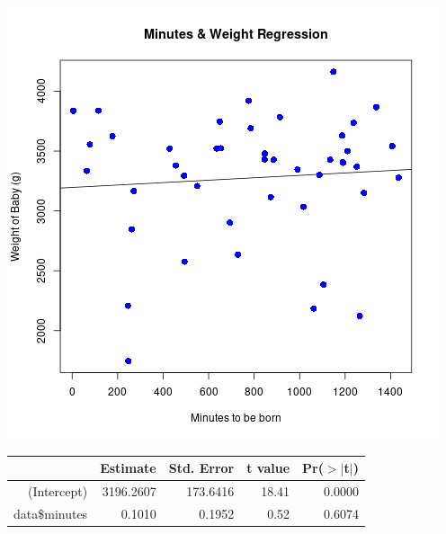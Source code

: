 \documentclass[11pt]{article}
\begin{document}
\begin{center}
\includegraphics[width=.9\linewidth]{bb_minutes_weight.png}
\end{center}

\begin{table}[ht]
\centering
\begin{tabular}{rrrrr}
  \hline
 & Estimate & Std. Error & t value & Pr($>$$|$t$|$) \\
  \hline
(Intercept) & 3196.2607 & 173.6416 & 18.41 & 0.0000 \\
  data\$minutes & 0.1010 & 0.1952 & 0.52 & 0.6074 \\
   \hline
\end{tabular}
\end{table}
\end{document}

